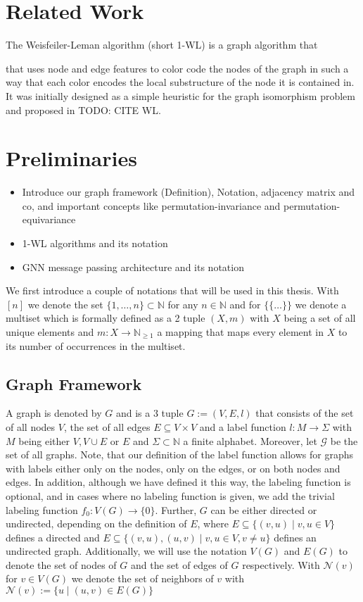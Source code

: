\documentclass[11pt, dvipsnames, DIV=12]{scrreprt}
\theoremstyle{definition}
\newcommand{\MSopen}{\{\!\!\{}
\newcommand{\MSclose}{\}\!\!\}}
\begin{document}
\section{Related Work}
The Weisfeiler-Leman algorithm (short 1-WL) is a graph algorithm that 


that uses node and edge features to color code the nodes of the graph in such a way that each color encodes the local substructure of the node it is contained in. It was initially designed as a simple heuristic for the graph isomorphism problem and proposed in TODO: CITE WL. 


\section{Preliminaries}
\begin{itemize}
    \item Introduce our graph framework (Definition), Notation, adjacency matrix and co, and important concepts like permutation-invariance and permutation-equivariance
    \item 1-WL algorithms and its notation
    \item GNN message passing architecture and its notation
\end{itemize}
We first introduce a couple of notations that will be used in this thesis. With $[n]$ we denote the set $\{1, \ldots, n\} \subset \mathbb{N}$ for any $n \in \mathbb{N}$ and for $\MSopen \ldots \MSclose$ we denote a multiset which is formally defined as a 2 tuple $(X, m)$ with $X$ being a set of all unique elements and $m: X \rightarrow \mathbb{N}_{\geq 1}$ a mapping that maps every element in $X$ to its number of occurrences in the multiset.

\subsection{Graph Framework}
A graph is denoted by $G$ and is a 3 tuple $G:= (V, E, l)$ that consists of the set of all nodes $V$, the set of all edges $E \subseteq V \times V$ and a label function $l: M \rightarrow \Sigma$ with $M$ being either $V, V \cup E$ or $E$ and $\Sigma \subset \mathbb{N}$ a finite alphabet. Moreover, let $\mathcal{G}$ be the set of all graphs. Note, that our definition of the label function allows for graphs with labels either only on the nodes, only on the edges, or on both nodes and edges. In addition, although we have defined it this way, the labeling function is optional, and in cases where no labeling function is given, we add the trivial labeling function $f_0: V(G) \rightarrow \{0\}$. Further, $G$ can be either directed or undirected, depending on the definition of $E$, where $E \subseteq \{(v,u) \mid v,u \in V\}$ defines a directed and $E \subseteq \{(v, u), (u,v) \mid v,u \in V, v\neq u\}$ defines an undirected graph. Additionally, we will use the notation $V(G)$ and $E(G)$ to denote the set of nodes of $G$ and the set of edges of $G$ respectively. With $\mathcal{N}(v)$ for $v \in V(G)$ we denote the set of neighbors of $v$ with $\mathcal{N}(v) := \{u \mid (u, v) \in E(G)\}$
\end{document}
